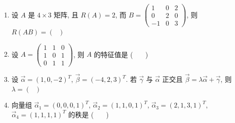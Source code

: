 \begin{enumerate}
	\item 设 $A$ 是 $4 \times 3$ 矩阵, 且 $R(A)=2$, 而 $B = \begin{pmatrix} 1 & 0 & 2 \\ 0 & 2 & 0 \\ -1 & 0 & 3 \end{pmatrix}$, 则 $R(AB)=( \ \ \ )$
	\vspace{0.5em}
	
	\item 设 $A = \begin{pmatrix} 1 & 1 & 0 \\ 1 & 0 & 1 \\ 0 & 1 & 1 \end{pmatrix}$, 则 $A$ 的特征值是 ( \ \ \  )
	\vspace{0.5em}
	
	\item 设 $\vec{\alpha} = (1, 0, -2)^T$, $\vec{\beta} = (-4, 2, 3)^T$. 若 $\vec{\gamma}$ 与 $\vec{\alpha}$ 正交且 $\vec{\beta} = \lambda\vec{\alpha} + \vec{\gamma}$, 则 $\lambda = ( \ \ \ )$
	\vspace{0.5em}
	
	\item 向量组 $\vec{\alpha}_1=(0,0,0,1)^T$, $\vec{\alpha}_2=(1,1,0,1)^T$, $\vec{\alpha}_3=(2,1,3,1)^T$, $\vec{\alpha}_4=(1,1,1,1)^T$ 的秩是 ( \ \ \ )
	\vspace{0.5em}
	

\end{enumerate}
